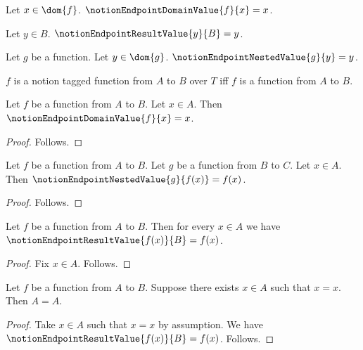 

\begin{definition}\label{notion_endpoint_domain_value}
    Let $x\in\dom{f}$.
    $\notionEndpointDomainValue{f}{x}=x$.
\end{definition}

\begin{definition}\label{notion_endpoint_result_value}
    Let $y\in B$.
    $\notionEndpointResultValue{y}{B}=y$.
\end{definition}

\begin{definition}\label{notion_endpoint_nested_value}
    Let $g$ be a function.
    Let $y\in\dom{g}$.
    $\notionEndpointNestedValue{g}{y}=y$.
\end{definition}

\begin{abbreviation}\label{notion_endpoint_tagged_function}
    $f$ is a notion tagged function from $A$ to $B$ over $T$ iff
        $f$ is a function from $A$ to $B$.
\end{abbreviation}

\begin{proposition}\label{notion_endpoint_domain_direct}
    Let $f$ be a function from $A$ to $B$.
    Let $x\in A$.
    Then $\notionEndpointDomainValue{f}{x}=x$.
\end{proposition}
\begin{proof}
    Follows.
\end{proof}

\begin{proposition}\label{notion_endpoint_nested_result}
    Let $f$ be a function from $A$ to $B$.
    Let $g$ be a function from $B$ to $C$.
    Let $x\in A$.
    Then $\notionEndpointNestedValue{g}{f(x)}=f(x)$.
\end{proposition}
\begin{proof}
    Follows.
\end{proof}

\begin{proposition}\label{notion_endpoint_bounded_fix}
    Let $f$ be a function from $A$ to $B$.
    Then for every $x\in A$ we have
        $\notionEndpointResultValue{f(x)}{B}=f(x)$.
\end{proposition}
\begin{proof}
    Fix $x\in A$.
    Follows.
\end{proof}

\begin{proposition}\label{notion_endpoint_bounded_take}
    Let $f$ be a function from $A$ to $B$.
    Suppose there exists $x\in A$ such that $x=x$.
    Then $A=A$.
\end{proposition}
\begin{proof}
    Take $x\in A$ such that $x=x$ by assumption.
    We have $\notionEndpointResultValue{f(x)}{B}=f(x)$.
    Follows.
\end{proof}

